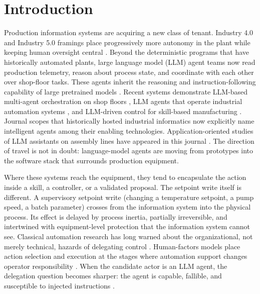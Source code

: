 \section{Introduction}
\label{sec:intro}

Production information systems are acquiring a new class of tenant. Industry
4.0 and Industry 5.0 framings place progressively more autonomy in the plant
while keeping human oversight central \cite{xu2021industry}. Beyond
the deterministic programs that have historically automated plants, large
language model (LLM) agent teams now read production telemetry, reason about
process state, and coordinate with each other over shop-floor tasks. These
agents inherit the reasoning and instruction-following capability of large
pretrained models \cite{zhao2023survey}. Recent
systems demonstrate LLM-based multi-agent orchestration on shop floors
\cite{zhao2026shopfloor}, LLM agents that operate industrial automation
systems \cite{xia2025control}, and LLM-driven control for skill-based
manufacturing \cite{koehle2026llmdriven}. Journal scopes that historically
hosted industrial informatics now explicitly name intelligent agents among
their enabling technologies. Application-oriented studies of LLM
assistants on assembly lines have appeared in this journal
\cite{llmdia2024}. The direction of travel is not in doubt: language-model
agents are moving from prototypes into the software stack that surrounds
production equipment.

Where these systems reach the equipment, they tend to encapsulate the action
inside a skill, a controller, or a validated proposal. The setpoint write
itself is different. A
supervisory setpoint write (changing a temperature setpoint, a pump speed,
a batch parameter) crosses from the information system into the physical
process. Its effect is delayed by process inertia, partially irreversible,
and intertwined with equipment-level protection that the information system
cannot see. Classical automation research has long warned about the
organizational, not merely technical, hazards of delegating control
\cite{bainbridge1983ironies}. Human-factors models place action
selection and execution at the stages where automation support changes
operator responsibility \cite{parasuraman2000model}. When the candidate
actor is an LLM agent, the delegation question becomes sharper: the agent is
capable, fallible, and susceptible to injected instructions
\cite{greshake2023injection,liu2024pinjection}.

